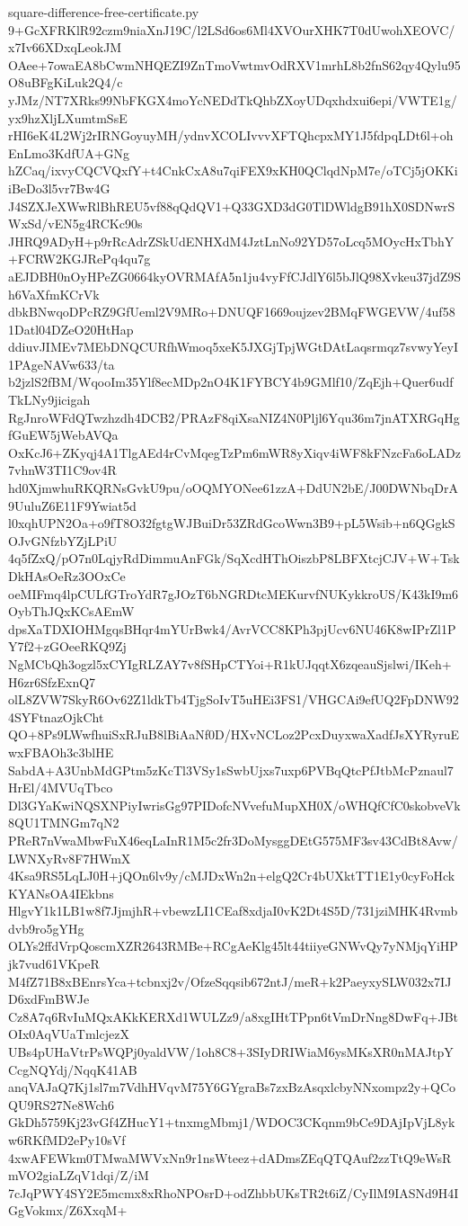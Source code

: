 \documentclass[11pt]{article}
\theoremstyle{definition}
\theoremstyle{remark}
\begin{document}
\begin{filecontents*}[overwrite]{square-difference-free-certificate.py}
9+GcXFRKlR92czm9niaXnJ19C/l2LSd6os6Ml4XVOurXHK7T0dUwohXEOVC/x7Iv66XDxqLeokJM
OAee+7owaEA8bCwmNHQEZI9ZnTmoVwtmvOdRXV1mrhL8b2fnS62qy4Qylu95O8uBFgKiLuk2Q4/c
yJMz/NT7XRks99NbFKGX4moYcNEDdTkQhbZXoyUDqxhdxui6epi/VWTE1g/yx9hzXljLXumtmSsE
rHI6eK4L2Wj2rIRNGoyuyMH/ydnvXCOLIvvvXFTQhcpxMY1J5fdpqLDt6l+ohEnLmo3KdfUA+GNg
hZCaq/ixvyCQCVQxfY+t4CnkCxA8u7qiFEX9xKH0QClqdNpM7e/oTCj5jOKKiiBeDo3l5vr7Bw4G
J4SZXJeXWwRlBhREU5vf88qQdQV1+Q33GXD3dG0TlDWldgB91hX0SDNwrSWxSd/vEN5g4RCKc90s
JHRQ9ADyH+p9rRcAdrZSkUdENHXdM4JztLnNo92YD57oLcq5MOycHxTbhY+FCRW2KGJRePq4qu7g
aEJDBH0nOyHPeZG0664kyOVRMAfA5n1ju4vyFfCJdlY6l5bJlQ98Xvkeu37jdZ9Sh6VaXfmKCrVk
dbkBNwqoDPcRZ9GfUeml2V9MRo+DNUQF1669oujzev2BMqFWGEVW/4uf581Datl04DZeO20HtHap
ddiuvJIMEv7MEbDNQCURfhWmoq5xeK5JXGjTpjWGtDAtLaqsrmqz7svwyYeyI1PAgeNAVw633/ta
b2jzlS2fBM/WqooIm35Ylf8ecMDp2nO4K1FYBCY4b9GMlf10/ZqEjh+Quer6udfTkLNy9jicigah
RgJnroWFdQTwzhzdh4DCB2/PRAzF8qiXsaNIZ4N0Pljl6Yqu36m7jnATXRGqHgfGuEW5jWebAVQa
OxKcJ6+ZKyqj4A1TlgAEd4rCvMqegTzPm6mWR8yXiqv4iWF8kFNzcFa6oLADz7vhnW3TI1C9ov4R
hd0XjmwhuRKQRNsGvkU9pu/oOQMYONee61zzA+DdUN2bE/J00DWNbqDrA9UuluZ6E11F9Ywiat5d
l0xqhUPN2Oa+o9fT8O32fgtgWJBuiDr53ZRdGcoWwn3B9+pL5Wsib+n6QGgkSOJvGNfzbYZjLPiU
4q5fZxQ/pO7n0LqjyRdDimmuAnFGk/SqXcdHThOiszbP8LBFXtcjCJV+W+TskDkHAsOeRz3OOxCe
oeMIFmq4lpCULfGTroYdR7gJOzT6bNGRDtcMEKurvfNUKykkroUS/K43kI9m6OybThJQxKCsAEmW
dpsXaTDXIOHMgqsBHqr4mYUrBwk4/AvrVCC8KPh3pjUcv6NU46K8wIPrZl1PY7f2+zGOeeRKQ9Zj
NgMCbQh3ogzl5xCYIgRLZAY7v8fSHpCTYoi+R1kUJqqtX6zqeauSjslwi/IKeh+H6zr6SfzExnQ7
olL8ZVW7SkyR6Ov62Z1ldkTb4TjgSoIvT5uHEi3FS1/VHGCAi9efUQ2FpDNW924SYFtnazOjkCht
QO+8Ps9LWwfhuiSxRJuB8lBiAaNf0D/HXvNCLoz2PcxDuyxwaXadfJsXYRyruEwxFBAOh3c3blHE
SabdA+A3UnbMdGPtm5zKcTl3VSy1sSwbUjxs7uxp6PVBqQtcPfJtbMcPznaul7HrEl/4MVUqTbco
Dl3GYaKwiNQSXNPiyIwrisGg97PIDofcNVvefuMupXH0X/oWHQfCfC0skobveVk8QU1TMNGm7qN2
PReR7nVwaMbwFuX46eqLaInR1M5c2fr3DoMysggDEtG575MF3sv43CdBt8Avw/LWNXyRv8F7HWmX
4Ksa9RS5LqLJ0H+jQOn6lv9y/cMJDxWn2n+elgQ2Cr4bUXktTT1E1y0cyFoHckKYANsOA4IEkbns
HlgvY1k1LB1w8f7JjmjhR+vbewzLI1CEaf8xdjaI0vK2Dt4S5D/731jziMHK4Rvmbdvb9ro5gYHg
OLYs2ffdVrpQoscmXZR2643RMBe+RCgAeKlg45lt44tiiyeGNWvQy7yNMjqYiHPjk7vud61VKpeR
M4fZ71B8xBEnrsYca+tcbnxj2v/OfzeSqqsib672ntJ/meR+k2PaeyxySLW032x7IJD6xdFmBWJe
Cz8A7q6RvIuMQxAKkKERXd1WULZz9/a8xgIHtTPpn6tVmDrNng8DwFq+JBtOIx0AqVUaTmlcjezX
UBs4pUHaVtrPsWQPj0yaldVW/1oh8C8+3SIyDRIWiaM6ysMKsXR0nMAJtpYCcgNQYdj/NqqK41AB
anqVAJaQ7Kj1sl7m7VdhHVqvM75Y6GYgraBs7zxBzAsqxlcbyNNxompz2y+QCoQU9RS27Ne8Wch6
GkDh5759Kj23vGf4ZHucY1+tnxmgMbmj1/WDOC3CKqnm9bCe9DAjIpVjL8ykw6RKfMD2ePy10sVf
4xwAFEWkm0TMwaMWVxNn9r1nsWteez+dADmsZEqQTQAuf2zzTtQ9eWsRmVO2giaLZqV1dqi/Z/iM
7cJqPWY4SY2E5mcmx8xRhoNPOsrD+odZhbbUKsTR2t6iZ/CyIlM9IASNd9H4IGgVokmx/Z6XxqM+

\end{filecontents*}
\end{document}
